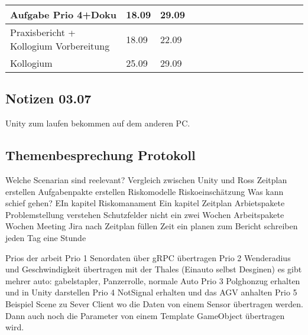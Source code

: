 \begin{landscape}
\begin{tabularx}{21cm}{|l|l|l|X|X|X|X|X|X|X|X|X|X|X|X|}
    Aufgabe Prio 4+Doku                    & 18.09           & 29.09         &                          &                          &                          &                          &                          &                          &                          &                          &                          & \cellcolor[HTML]{68CBD0} & \cellcolor[HTML]{68CBD0} & \cellcolor[HTML]{68CBD0} \\ \hline
    Praxisbericht + Kollogium Vorbereitung & 18.09           & 22.09         &                          &                          &                          &                          &                          &                          &                          &                          &                          &                          & \cellcolor[HTML]{34FF34} &                          \\ \hline
    Kollogium                              & 25.09           & 29.09         &                          &                          &                          &                          &                          &                          &                          &                          &                          &                          &                          & \cellcolor[HTML]{FE0000} \\ \hline
\end{tabularx}
\end{landscape}
   

\subsection{Notizen 03.07}
Unity zum laufen bekommen auf dem anderen PC.


\subsection{Themenbesprechung Protokoll}
Welche Scenarian sind reelevant?
Vergleich zwischen Unity und Ross
Zeitplan erstellen
Aufgabenpakte erstellen
Riskomodelle
Riskoeinschätzung
Was kann schief gehen?
EIn kapitel Riskomanament
Ein kapitel Zeitplan Arbietspakete
Problemstellung verstehen
Schutzfelder nicht
ein zwei Wochen Arbeitspakete
Wochen Meeting
Jira nach Zeitplan füllen
Zeit ein planen zum Bericht schreiben jeden Tag eine Stunde 


Prios der arbeit
Prio 1 Senordaten über gRPC übertragen
Prio 2 Wenderadius und Geschwindigkeit übertragen mit der Thales (Einauto selbst Desginen)
es gibt mehrer auto: gabelstapler, Panzerrolle, normale Auto
Prio 3 Polghonzug erhalten und in Unity darstellen
Prio 4 NotSignal erhalten und das AGV anhalten 
Prio 5 Beispiel Scene zu Sever Client wo die Daten von einem Sensor übertragen werden. Dann auch noch die Parameter von einem Template GameObject übertragen wird.


